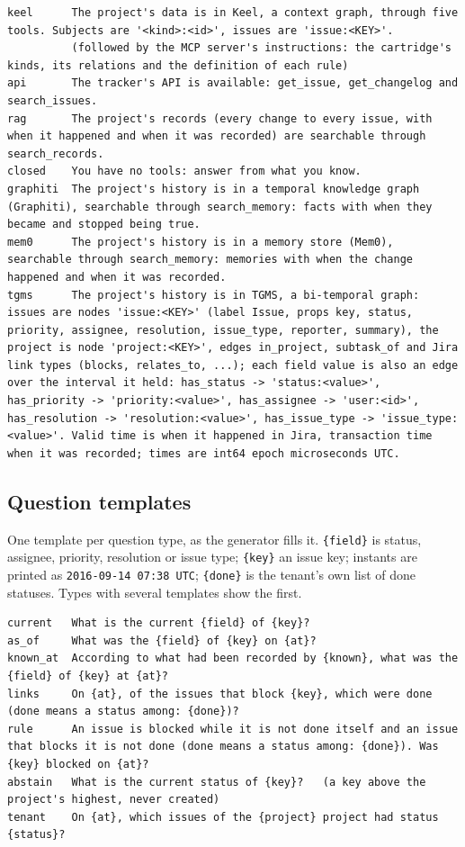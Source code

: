 \documentclass{article}
\newcommand{\code}[1]{\texttt{#1}}
\begin{document}
\begin{lstlisting}
keel      The project's data is in Keel, a context graph, through five tools. Subjects are '<kind>:<id>', issues are 'issue:<KEY>'.
          (followed by the MCP server's instructions: the cartridge's kinds, its relations and the definition of each rule)
api       The tracker's API is available: get_issue, get_changelog and search_issues.
rag       The project's records (every change to every issue, with when it happened and when it was recorded) are searchable through search_records.
closed    You have no tools: answer from what you know.
graphiti  The project's history is in a temporal knowledge graph (Graphiti), searchable through search_memory: facts with when they became and stopped being true.
mem0      The project's history is in a memory store (Mem0), searchable through search_memory: memories with when the change happened and when it was recorded.
tgms      The project's history is in TGMS, a bi-temporal graph: issues are nodes 'issue:<KEY>' (label Issue, props key, status, priority, assignee, resolution, issue_type, reporter, summary), the project is node 'project:<KEY>', edges in_project, subtask_of and Jira link types (blocks, relates_to, ...); each field value is also an edge over the interval it held: has_status -> 'status:<value>', has_priority -> 'priority:<value>', has_assignee -> 'user:<id>', has_resolution -> 'resolution:<value>', has_issue_type -> 'issue_type:<value>'. Valid time is when it happened in Jira, transaction time when it was recorded; times are int64 epoch microseconds UTC.
\end{lstlisting}

\subsection{Question templates}
\label{app:templates}

One template per question type, as the generator fills it. \code{\{field\}} is status, assignee, priority, resolution or issue type; \code{\{key\}} an issue key; instants are printed as \code{2016-09-14 07:38 UTC}; \code{\{done\}} is the tenant's own list of done statuses. Types with several templates show the first.

\begin{lstlisting}
current   What is the current {field} of {key}?
as_of     What was the {field} of {key} on {at}?
known_at  According to what had been recorded by {known}, what was the {field} of {key} at {at}?
links     On {at}, of the issues that block {key}, which were done (done means a status among: {done})?
rule      An issue is blocked while it is not done itself and an issue that blocks it is not done (done means a status among: {done}). Was {key} blocked on {at}?
abstain   What is the current status of {key}?   (a key above the project's highest, never created)
tenant    On {at}, which issues of the {project} project had status {status}?
\end{lstlisting}
\end{document}
